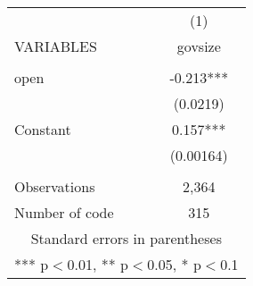 \documentclass[]{article}
\begin{document}
\begin{tabular}{lc} \hline
 & (1) \\
VARIABLES & govsize \\ \hline
 &  \\
open & -0.213*** \\
 & (0.0219) \\
Constant & 0.157*** \\
 & (0.00164) \\
 &  \\
Observations & 2,364 \\
 Number of code & 315 \\ \hline
\multicolumn{2}{c}{ Standard errors in parentheses} \\
\multicolumn{2}{c}{ *** p$<$0.01, ** p$<$0.05, * p$<$0.1} \\
\end{tabular}
\end{document}
